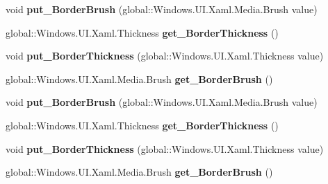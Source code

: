 \begin{DoxyCompactItemize}
void {\bfseries put\+\_\+\+Border\+Brush} (global\+::\+Windows.\+U\+I.\+Xaml.\+Media.\+Brush value)
\item 
\mbox{\label{interface_windows_1_1_u_i_1_1_xaml_1_1_controls_1_1_i_grid2_aa6787459b59d92219e0bfdc4e595ce55}} 
global\+::\+Windows.\+U\+I.\+Xaml.\+Thickness {\bfseries get\+\_\+\+Border\+Thickness} ()
\item 
\mbox{\label{interface_windows_1_1_u_i_1_1_xaml_1_1_controls_1_1_i_grid2_a166919d21dd1a031ab3e7d2edc22938a}} 
void {\bfseries put\+\_\+\+Border\+Thickness} (global\+::\+Windows.\+U\+I.\+Xaml.\+Thickness value)
\item 
\mbox{\label{interface_windows_1_1_u_i_1_1_xaml_1_1_controls_1_1_i_grid2_a8ad45ad9fd4553c6dfdf276b103dd4f5}} 
global\+::\+Windows.\+U\+I.\+Xaml.\+Media.\+Brush {\bfseries get\+\_\+\+Border\+Brush} ()
\item 
\mbox{\label{interface_windows_1_1_u_i_1_1_xaml_1_1_controls_1_1_i_grid2_af4bf398df0a43ba5b9b4fcd3a31bb58a}} 
void {\bfseries put\+\_\+\+Border\+Brush} (global\+::\+Windows.\+U\+I.\+Xaml.\+Media.\+Brush value)
\item 
\mbox{\label{interface_windows_1_1_u_i_1_1_xaml_1_1_controls_1_1_i_grid2_aa6787459b59d92219e0bfdc4e595ce55}} 
global\+::\+Windows.\+U\+I.\+Xaml.\+Thickness {\bfseries get\+\_\+\+Border\+Thickness} ()
\item 
\mbox{\label{interface_windows_1_1_u_i_1_1_xaml_1_1_controls_1_1_i_grid2_a166919d21dd1a031ab3e7d2edc22938a}} 
void {\bfseries put\+\_\+\+Border\+Thickness} (global\+::\+Windows.\+U\+I.\+Xaml.\+Thickness value)
\item 
\mbox{\label{interface_windows_1_1_u_i_1_1_xaml_1_1_controls_1_1_i_grid2_a8ad45ad9fd4553c6dfdf276b103dd4f5}} 
global\+::\+Windows.\+U\+I.\+Xaml.\+Media.\+Brush {\bfseries get\+\_\+\+Border\+Brush} ()

\end{DoxyCompactItemize}
